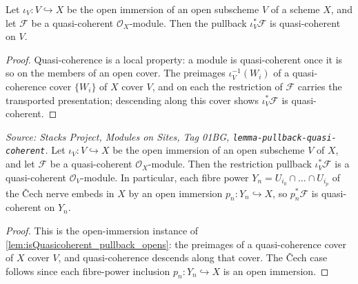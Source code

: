 \begin{lemma}

  \label{lem:isQuasicoherent_pullback_opens}
  Let \(\iota_V : V \hookrightarrow X\) be the open immersion of an open subscheme \(V\) of a
  scheme \(X\), and let \(\mathcal{F}\) be a quasi-coherent \(\mathcal{O}_X\)-module. Then the
  pullback \(\iota_V^*\mathcal{F}\) is quasi-coherent on \(V\).
\end{lemma}
\begin{proof}

\leanok
  Quasi-coherence is a local property: a module is quasi-coherent once it is so on the members
  of an open cover. The preimages \(\iota_V^{-1}(W_i)\) of a quasi-coherence cover \(\{W_i\}\)
  of \(X\) cover \(V\), and on each the restriction of \(\mathcal{F}\) carries the transported
  presentation; descending along this cover shows \(\iota_V^*\mathcal{F}\) is quasi-coherent.
\end{proof}

\begin{lemma}
  \label{lem:pullback_preserves_quasicoherent}
  \textit{Source: Stacks Project, Modules on Sites, Tag 01BG, \texttt{lemma-pullback-quasi-coherent}.}
  Let \(\iota_V : V \hookrightarrow X\) be the open immersion of an open subscheme \(V\) of \(X\),
  and let \(\mathcal{F}\) be a quasi-coherent \(\mathcal{O}_X\)-module. Then the restriction
  pullback \(\iota_V^*\mathcal{F}\) is a quasi-coherent \(\mathcal{O}_V\)-module. In particular,
  each fibre power \(Y_n = U_{i_0} \cap \dots \cap U_{i_p}\) of the {\v C}ech nerve embeds in
  \(X\) by an open immersion \(p_n : Y_n \hookrightarrow X\), so \(p_n^*\mathcal{F}\) is
  quasi-coherent on \(Y_n\).
\end{lemma}
\begin{proof}
  This is the open-immersion instance of \cref{lem:isQuasicoherent_pullback_opens}: the
  preimages of a quasi-coherence cover of \(X\) cover \(V\), and quasi-coherence descends
  along that cover. The {\v C}ech case follows since each fibre-power inclusion
  \(p_n : Y_n \hookrightarrow X\) is an open immersion.
\end{proof}

